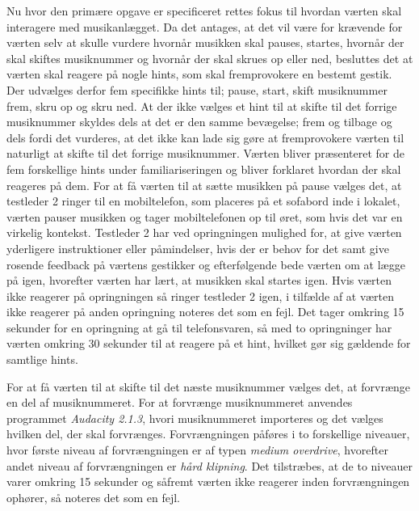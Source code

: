 Nu hvor den primære opgave er specificeret rettes fokus til hvordan værten skal interagere med musikanlægget. Da det antages, at det vil være for krævende for værten selv at skulle vurdere hvornår musikken skal pauses, startes, hvornår der skal skiftes musiknummer og hvornår der skal skrues op eller ned, besluttes det at værten skal reagere på nogle hints, som skal fremprovokere en bestemt gestik. Der udvælges derfor fem specifikke hints til; pause, start, skift musiknummer frem, skru op og skru ned. At der ikke vælges et hint til at skifte til det forrige musiknummer skyldes dels at det er den samme bevægelse; frem og tilbage og dels fordi det vurderes, at det ikke kan lade sig gøre at fremprovokere værten til naturligt at skifte til det forrige musiknummer. Værten bliver præsenteret for de fem forskellige hints under familiariseringen og bliver forklaret hvordan der skal reageres på dem. For at få værten til at sætte musikken på pause vælges det, at testleder 2 ringer til en mobiltelefon, som placeres på et sofabord inde i lokalet, værten pauser musikken og tager mobiltelefonen op til øret, som hvis det var en virkelig kontekst. Testleder 2 har ved opringningen mulighed for, at give værten yderligere instruktioner eller påmindelser, hvis der er behov for det samt give rosende feedback på værtens gestikker og efterfølgende bede værten om at lægge på igen, hvorefter værten har lært, at musikken skal startes igen. Hvis værten ikke reagerer på opringningen så ringer testleder 2 igen, i tilfælde af at værten ikke reagerer på anden opringning noteres det som en fejl. Det tager omkring 15 sekunder for en opringning at gå til telefonsvaren, så med to opringninger har værten omkring 30 sekunder til at reagere på et hint, hvilket gør sig gældende for samtlige hints. 

For at få værten til at skifte til det næste musiknummer vælges det, at forvrænge en del af musiknummeret. For at forvrænge musiknummeret anvendes programmet \textit{Audacity 2.1.3}, hvori musiknummeret importeres og det vælges hvilken del, der skal forvrænges. Forvrængningen påføres i to forskellige niveauer, hvor første niveau af forvrængningen er af typen \textit{medium overdrive}, hvorefter andet niveau af forvrængningen er \textit{hård klipning}. Det tilstræbes, at de to niveauer varer omkring 15 sekunder og såfremt værten ikke reagerer inden forvrængningen ophører, så noteres det som en fejl. 

